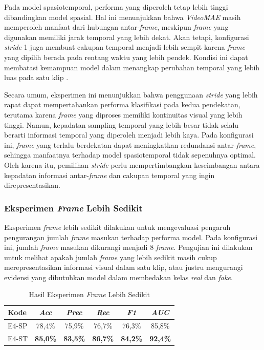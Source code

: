 Pada model spasiotemporal, performa yang diperoleh tetap lebih tinggi dibandingkan model spasial. Hal ini menunjukkan bahwa \textit{VideoMAE} masih memperoleh manfaat dari hubungan antar-\textit{frame}, meskipun \textit{frame} yang digunakan memiliki jarak temporal yang lebih dekat. Akan tetapi, konfigurasi \textit{stride} 1 juga membuat cakupan temporal menjadi lebih sempit karena \textit{frame} yang dipilih berada pada rentang waktu yang lebih pendek. Kondisi ini dapat membatasi kemampuan model dalam menangkap perubahan temporal yang lebih luas pada satu klip \cite{Gu2021,tong2022videomaemaskedautoencodersdataefficient}.

Secara umum, eksperimen ini menunjukkan bahwa penggunaan \textit{stride} yang lebih rapat dapat mempertahankan performa klasifikasi pada kedua pendekatan, terutama karena \textit{frame} yang diproses memiliki kontinuitas visual yang lebih tinggi. Namun, kepadatan sampling temporal yang lebih besar tidak selalu berarti informasi temporal yang diperoleh menjadi lebih kaya. Pada konfigurasi ini, \textit{frame} yang terlalu berdekatan dapat meningkatkan redundansi antar-\textit{frame}, sehingga manfaatnya terhadap model spasiotemporal tidak sepenuhnya optimal. Oleh karena itu, pemilihan \textit{stride} perlu mempertimbangkan keseimbangan antara kepadatan informasi antar-\textit{frame} dan cakupan temporal yang ingin direpresentasikan.

\subsubsection{Eksperimen \textit{Frame} Lebih Sedikit} \label{IV.Eksperimen_Utama_Frame_Sedikit}

Eksperimen \textit{frame} lebih sedikit dilakukan untuk mengevaluasi pengaruh pengurangan jumlah \textit{frame} masukan terhadap performa model. Pada konfigurasi ini, jumlah \textit{frame} masukan dikurangi menjadi 8 \textit{frame}. Pengujian ini dilakukan untuk melihat apakah jumlah \textit{frame} yang lebih sedikit masih cukup merepresentasikan informasi visual dalam satu klip, atau justru mengurangi evidensi yang dibutuhkan model dalam membedakan kelas \textit{real} dan \textit{fake}.

\begin{table}[htbp]
\centering
\caption{Hasil Eksperimen \textit{Frame} Lebih Sedikit}
\label{table:4.eksperimen-utama-frame-sedikit}
\begin{tabular}{lccccc}
\toprule
\textbf{Kode} &
\textbf{\textit{Acc}} &
\textbf{\textit{Prec}} &
\textbf{\textit{Rec}} &
\textbf{\textit{F1}} &
\textbf{\textit{AUC}} \\
\midrule
E4-SP & 78,4\% & 75,9\% & 76,7\% & 76,3\% & 85,8\% \\
E4-ST & \textbf{85,0\%} & \textbf{83,5\%} & \textbf{86,7\%} & \textbf{84,2\%} & \textbf{92,4\%} \\
\bottomrule
\end{tabular}
\end{table}

